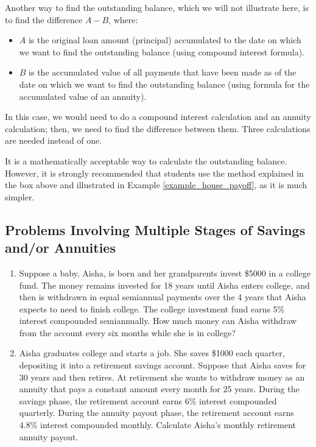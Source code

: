 Another way to find the outstanding balance, which we will not illustrate here, is to find the difference $A - B$, where:
\begin{itemize}
    \item $A$ is the original loan amount (principal) accumulated to the date on which we want to find the outstanding balance (using compound interest formula).
    \item $B$ is the accumulated value of all payments that have been made as of the date on which we want to find the outstanding balance (using formula for the accumulated value of an annuity).
\end{itemize}
In this case, we would need to do a compound interest calculation and an annuity calculation; then, we need to find the difference between them. Three calculations are needed instead of one.

It is a mathematically acceptable way to calculate the outstanding balance. However, it is strongly recommended that students use the method explained in the box above and illustrated in Example \ref{example_house_payoff}, as it is much simpler.


\subsection{Problems Involving Multiple Stages of Savings and/or Annuities}

\begin{enumerate}
    \item Suppose a baby, Aisha, is born and her grandparents invest \$5000 in a college fund. The money remains invested for 18 years until Aisha enters college, and then is withdrawn in equal semiannual payments over the 4 years that Aisha expects to need to finish college. The college investment fund earns 5\% interest compounded semiannually. How much money can Aisha withdraw from the account every six months while she is in college?
    \item Aisha graduates college and starts a job. She saves \$1000 each quarter, depositing it into a retirement savings account. Suppose that Aisha saves for 30 years and then retires. At retirement she wants to withdraw money as an annuity that pays a constant amount every month for 25 years. During the savings phase, the retirement account earns 6\% interest compounded quarterly. During the annuity payout phase, the retirement account earns 4.8\% interest compounded monthly. Calculate Aisha’s monthly retirement annuity payout.
\end{enumerate}

